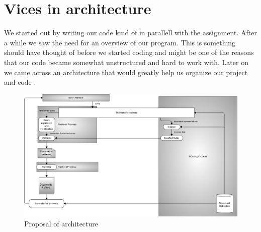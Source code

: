 \section{Vices in architecture}
We started out by writing our code kind of in parallell with the assignment. After a while we saw the need for an overview of our program. This is something should have thought of before we started coding and might be one of the reasons that our code became somewhat unstructured and hard to work with. Later on we came across an architecture that would greatly help us organize our project and code \cite{MIR}.

\begin{figure}[h]
\centering
\includegraphics[scale=0.33]{improvements/alternative_architecture.png}
\caption{Proposal of architecture}
\end{figure}